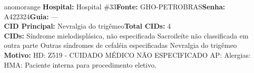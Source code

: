 \documentclass[a4paper,10pt]{article}
\begin{document}
\begin{anomalycard}[Interna\c{c}\~{a}o \#166570 | Pac. \#15111 | ALTO (z=4.07) | LOS: 1d | 24/02/2026\,$\to$\,25/02/2026]{anomorange}
\textbf{Hospital:} Hospital \#33\quad \textbf{Fonte:} GHO-PETROBRAS\quad \textbf{Senha:} A422324\quad \textbf{Guia:} ---\\

\textbf{CID Principal:} {\small Nevralgia do trigêmeo}\quad\textbf{Total CIDs:} 4\\

\textbf{CIDs:} {\scriptsize Síndrome mielodisplásica, não especificada \textbar{} Sacroileíte não classificada em outra parte \textbar{} Outras síndromes de cefaléia especificadas \textbar{} Nevralgia do trigêmeo}\\

\textbf{Motivo:} {\scriptsize HD: Z519 - CUIDADO MÉDICO NÃO ESPECIFICADO AP: Alergias: HMA: Paciente interna para procedimento eletivo.}\\



\end{anomalycard}
\end{document}

